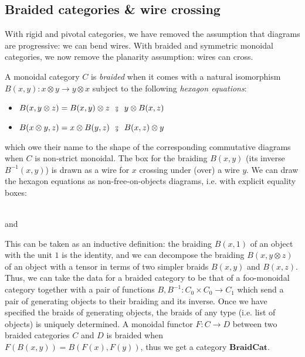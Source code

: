 
\subsection{Braided categories \& wire crossing} \label{subsection:symmetric}

With rigid and pivotal categories, we have removed the assumption that diagrams are progressive: we can bend wires.
With braided and symmetric monoidal categories, we now remove the planarity assumption: wires can cross.

A monoidal category $C$ is \emph{braided} when it comes with a natural isomorphism $B(x, y) : x \otimes y \to y \otimes x$ subject to the following \emph{hexagon equations}:
\begin{itemize}
\item $B(x, y \otimes z) = B(x,y) \otimes z \s \fcmp \s y \otimes B(x,z)$
\item $B(x \otimes y, z) = x \otimes B(y,z) \s \fcmp \s B(x,z) \otimes y$
\end{itemize}
which owe their name to the shape of the corresponding commutative diagrams when $C$ is non-strict monoidal.
The box for the braiding $B(x, y)$ (its inverse $B^{-1}(x, y)$) is drawn as a wire for $x$ crossing under (over) a wire $y$.
We can draw the hexagon equations as non-free-on-objects diagrams, i.e. with explicit equality boxes:
\begin{center}
\\
\vspace{10pt}
and \hspace{10pt} 
\end{center}
This can be taken as an inductive definition: the braiding $B(x,1)$ of an object with the unit $1$ is the identity, and we can decompose the braiding $B(x, y \otimes z)$ of an object with a tensor in terms of two simpler braids $B(x,y)$ and $B(x,z)$.
Thus, we can take the data for a braided category to be that of a foo-monoidal category together with a pair of functions $B, B^{-1} : C_0 \times C_0 \to C_1$ which send a pair of generating objects to their braiding and its inverse.
Once we have specified the braids of generating objects, the braids of any type (i.e. list of objects) is uniquely determined.
A monoidal functor $F : C \to D$ between two braided categories $C$ and $D$ is braided when $F(B(x, y)) = B(F(x), F(y))$, thus we get a category $\mathbf{BraidCat}$.

